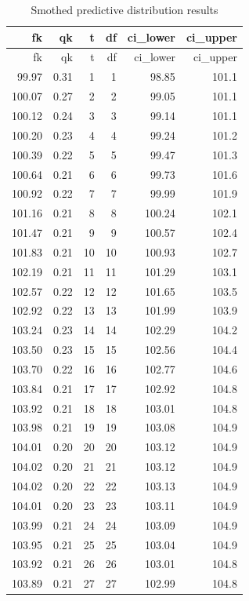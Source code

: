 \documentclass[
]{article}
\begin{document}
\begin{longtable}[]{@{}rrrrrr@{}}
\caption{Smothed predictive distribution results}\tabularnewline
\toprule
fk & qk & t & df & ci\_lower & ci\_upper \\
\midrule
\endfirsthead
\toprule
fk & qk & t & df & ci\_lower & ci\_upper \\
\midrule
\endhead
99.97 & 0.31 & 1 & 1 & 98.85 & 101.1 \\
100.07 & 0.27 & 2 & 2 & 99.05 & 101.1 \\
100.12 & 0.24 & 3 & 3 & 99.14 & 101.1 \\
100.20 & 0.23 & 4 & 4 & 99.24 & 101.2 \\
100.39 & 0.22 & 5 & 5 & 99.47 & 101.3 \\
100.64 & 0.21 & 6 & 6 & 99.73 & 101.6 \\
100.92 & 0.22 & 7 & 7 & 99.99 & 101.9 \\
101.16 & 0.21 & 8 & 8 & 100.24 & 102.1 \\
101.47 & 0.21 & 9 & 9 & 100.57 & 102.4 \\
101.83 & 0.21 & 10 & 10 & 100.93 & 102.7 \\
102.19 & 0.21 & 11 & 11 & 101.29 & 103.1 \\
102.57 & 0.22 & 12 & 12 & 101.65 & 103.5 \\
102.92 & 0.22 & 13 & 13 & 101.99 & 103.9 \\
103.24 & 0.23 & 14 & 14 & 102.29 & 104.2 \\
103.50 & 0.23 & 15 & 15 & 102.56 & 104.4 \\
103.70 & 0.22 & 16 & 16 & 102.77 & 104.6 \\
103.84 & 0.21 & 17 & 17 & 102.92 & 104.8 \\
103.92 & 0.21 & 18 & 18 & 103.01 & 104.8 \\
103.98 & 0.21 & 19 & 19 & 103.08 & 104.9 \\
104.01 & 0.20 & 20 & 20 & 103.12 & 104.9 \\
104.02 & 0.20 & 21 & 21 & 103.12 & 104.9 \\
104.02 & 0.20 & 22 & 22 & 103.13 & 104.9 \\
104.01 & 0.20 & 23 & 23 & 103.11 & 104.9 \\
103.99 & 0.21 & 24 & 24 & 103.09 & 104.9 \\
103.95 & 0.21 & 25 & 25 & 103.04 & 104.9 \\
103.92 & 0.21 & 26 & 26 & 103.01 & 104.8 \\
103.89 & 0.21 & 27 & 27 & 102.99 & 104.8 \\

\end{longtable}
\end{document}
